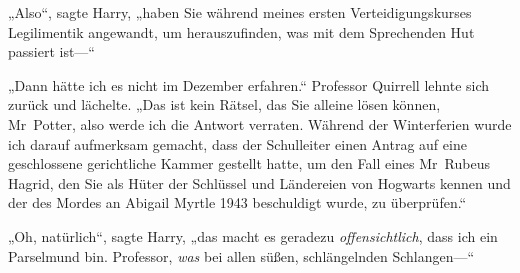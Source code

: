„Also“, sagte Harry, „haben Sie während meines ersten Verteidigungskurses Legilimentik angewandt, um herauszufinden, was mit dem Sprechenden Hut passiert ist—“

„Dann hätte ich es nicht im Dezember erfahren.“ Professor Quirrell lehnte sich zurück und lächelte. „Das ist kein Rätsel, das Sie alleine lösen können, Mr~Potter, also werde ich die Antwort verraten. Während der Winterferien wurde ich darauf aufmerksam gemacht, dass der Schulleiter einen Antrag auf eine geschlossene gerichtliche Kammer gestellt hatte, um den Fall eines Mr~Rubeus Hagrid, den Sie als Hüter der Schlüssel und Ländereien von Hogwarts kennen und der des Mordes an Abigail Myrtle 1943 beschuldigt wurde, zu überprüfen.“

„Oh, natürlich“, sagte Harry, „das macht es geradezu \emph{offensichtlich}, dass ich ein Parselmund bin. Professor, \emph{was} bei allen süßen, schlängelnden Schlangen—“

